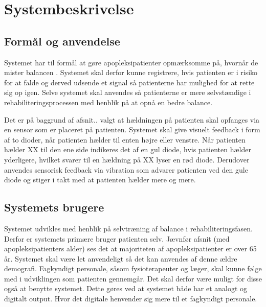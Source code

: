 \section{Systembeskrivelse}  

\subsection{Formål og anvendelse}
Systemet har til formål at gøre apopleksipatienter opmærksomme på, hvornår de mister balancen . Systemet skal derfor kunne registrere, hvis patienten er i risiko for at falde og derved udsende et signal så patienterne har mulighed for at rette sig op igen. Selve systemet skal anvendes så patienterne er mere selvstændige i rehabiliteringsprocessen med henblik på at opnå en bedre balance. 

Det er på baggrund af afsnit.. valgt at hældningen på patienten skal opfanges via en sensor som er placeret på patienten. Systemet skal give visuelt feedback i form af to dioder, når patienten hælder til enten højre eller venstre. Når patienten hælder XX til den ene side indikeres det af en gul diode, hvis patienten hælder yderligere, hvilket svarer til en hældning på XX lyser en rød diode. Derudover anvendes sensorisk feedback via vibration som advarer patienten ved den gule diode og stiger i takt med at patienten hælder mere og mere.  


\subsection{Systemets brugere}
Systemet udvikles med henblik på selvtræning af balance i rehabiliteringsfasen. Derfor er systemets primære bruger patienten selv. Jævnfør afsnit (med apopleksipatienters alder) ses det at majoriteten af apopleksipatienter er over 65 år. Systemet skal være let anvendeligt så det kan anvendes af denne ældre demografi. Fagkyndigt personale, såsom fysioterapeuter og læger, skal kunne følge med i udviklingen som patienten gennemgår. Det skal derfor være muligt for disse også at benytte systemet. Dette gøres ved at systemet både har et analogt og digitalt output. Hvor det digitale henvender sig mere til et fagkyndigt personale.

